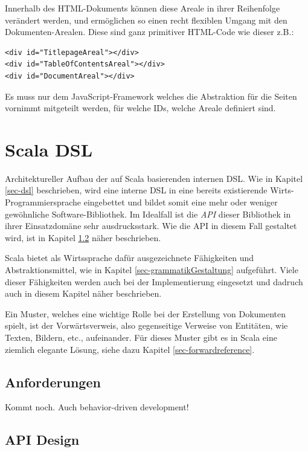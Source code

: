 Innerhalb des HTML-Dokuments können diese Areale in ihrer Reihenfolge
verändert werden, und ermöglichen so einen recht flexiblen Umgang mit
den Doku\-men\-ten-Arealen. Diese sind ganz primitiver HTML-Code wie dieser
z.B.:

\begin{verbatim}
<div id="TitlepageAreal"></div>
<div id="TableOfContentsAreal"></div>
<div id="DocumentAreal"></div>
\end{verbatim}

Es muss nur dem JavaScript-Framework welches die Abstraktion für die
Seiten vornimmt mitgeteilt werden, für welche IDs, welche Areale definiert
sind.


\section{Scala DSL}\label{sec-scalaDSL}

Architektureller Aufbau der auf Scala basierenden internen DSL. Wie in
Kapitel \ref{sec-dsl} beschrieben, wird eine interne DSL in eine bereits
existierende Wirts-Programmiersprache eingebettet und bildet somit
eine mehr oder weniger gewöhn\-liche Software-Bibliothek. Im Idealfall ist
die \emph{API} dieser Bibliothek in ihrer Einsatzdomäne sehr ausdrucksstark.
Wie die API in diesem Fall gestaltet wird, ist in Kapitel \ref{sec-apiDesign}
näher beschrieben.

Scala bietet als Wirtssprache dafür ausgezeichnete Fähigkeiten und
Abstraktionsmittel, wie in Kapitel \ref{sec-grammatikGestaltung} aufgeführt.
Viele dieser Fähigkeiten werden auch bei der Implementierung eingesetzt
und dadruch auch in diesem Kapitel näher beschrieben.

Ein Muster, welches eine wichtige Rolle bei der Erstellung von Dokumenten
spielt, ist der Vorwärtsverweis, also gegenseitige Verweise von Entitäten,
wie Texten, Bildern, etc., aufeinander. Für dieses Muster gibt es in Scala
eine ziemlich elegante Lösung, siehe dazu Kapitel \ref{sec-forwardreference}.

\subsection{Anforderungen}

Kommt noch. Auch behavior-driven development!

\subsection{API Design}\label{sec-apiDesign}

